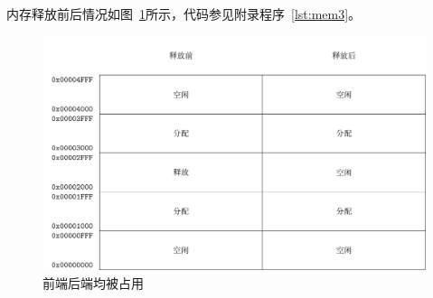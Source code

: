 内存释放前后情况如图~\ref{fig:mem3}所示，代码参见附录程序~\ref{lst:mem3}。
\begin{figure}[H]
  \centering
  \includegraphics[width=.7\textwidth]{../Fig/mem/mem3.pdf}
  \caption{前端后端均被占用}
  \label{fig:mem3}
\end{figure}

